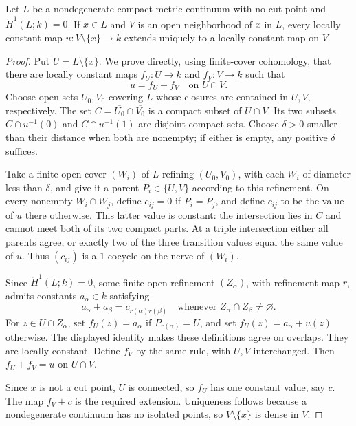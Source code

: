 \begin{lemma}\label{ann:extension}
Let $L$ be a nondegenerate compact metric continuum with no cut point and
$\check H^1(L;k)=0$. If $x\in L$ and $V$ is an open neighborhood of $x$
in $L$, every locally constant map $u:V\setminus\{x\}\to k$ extends
uniquely to a locally constant map on $V$.
\end{lemma}

\begin{proof}
Put $U=L\setminus\{x\}$. We prove directly, using finite-cover
cohomology, that there are locally constant maps $f_U:U\to k$ and
$f_V:V\to k$ such that
\[
  u=f_U+f_V\quad\text{on }U\cap V.
\]
Choose open sets $U_0,V_0$ covering $L$ whose closures are contained in
$U,V$, respectively. The set
$C=\overline{U_0}\cap\overline{V_0}$ is a compact subset of $U\cap V$.
Its two subsets $C\cap u^{-1}(0)$ and $C\cap u^{-1}(1)$ are disjoint
compact sets. Choose $\delta>0$ smaller than their distance when both
are nonempty; if either is empty, any positive $\delta$ suffices.

Take a finite open cover $(W_i)$ of $L$ refining $(U_0,V_0)$, with each
$W_i$ of diameter less than $\delta$, and give it a parent
$P_i\in\{U,V\}$ according to this refinement. On every nonempty
$W_i\cap W_j$, define $c_{ij}=0$ if $P_i=P_j$, and define $c_{ij}$ to
be the value of $u$ there otherwise. This latter value is constant:
the intersection lies in $C$ and cannot meet both of its two compact
parts. At a triple intersection either all parents agree, or exactly
two of the three transition values equal the same value of $u$.
Thus $(c_{ij})$ is a $1$-cocycle on the nerve of $(W_i)$.

Since $\check H^1(L;k)=0$, some finite open refinement $(Z_\alpha)$,
with refinement map $r$, admits constants $a_\alpha\in k$ satisfying
\[
  a_\alpha+a_\beta=c_{r(\alpha)r(\beta)}
  \quad\text{whenever }Z_\alpha\cap Z_\beta\ne\varnothing.
\]
For $z\in U\cap Z_\alpha$, set $f_U(z)=a_\alpha$ if
$P_{r(\alpha)}=U$, and set $f_U(z)=a_\alpha+u(z)$ otherwise.
The displayed identity makes these definitions agree on overlaps.
They are locally constant. Define $f_V$ by the same rule, with $U,V$
interchanged. Then $f_U+f_V=u$ on $U\cap V$.

Since $x$ is not a cut point, $U$ is connected, so $f_U$ has one
constant value, say $c$. The map $f_V+c$ is the required extension.
Uniqueness follows because a nondegenerate continuum has no isolated
points, so $V\setminus\{x\}$ is dense in $V$.
\end{proof}

